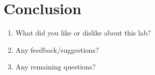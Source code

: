 \documentclass[11pt]{article}%
\begin{document}
\section{Conclusion}
\begin{enumerate}
    \item What did you like or dislike about this lab?
    \item Any feedback/suggestions?
    \item Any remaining questions?
\end{enumerate}
\end{document}
